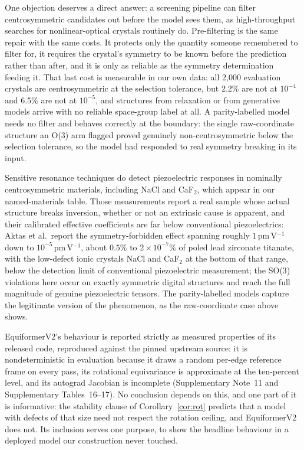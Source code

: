 One objection deserves a direct answer: a screening pipeline can filter centrosymmetric candidates out before the model sees them, as high-throughput searches for nonlinear-optical crystals routinely do. Pre-filtering is the same repair with the same costs. It protects only the quantity someone remembered to filter for, it requires the crystal's symmetry to be known before the prediction rather than after, and it is only as reliable as the symmetry determination feeding it. That last cost is measurable in our own data: all 2,000 evaluation crystals are centrosymmetric at the selection tolerance, but 2.2\% are not at $10^{-4}$ and 6.5\% are not at $10^{-5}$, and structures from relaxation or from generative models arrive with no reliable space-group label at all. A parity-labelled model needs no filter and behaves correctly at the boundary: the single raw-coordinate structure an O(3) arm flagged proved genuinely non-centrosymmetric below the selection tolerance, so the model had responded to real symmetry breaking in its input.

Sensitive resonance techniques do detect piezoelectric responses in nominally centrosymmetric materials\cite{aktas2021nominally}, including NaCl and CaF$_2$, which appear in our named-materials table. Those measurements report a real sample whose actual structure breaks inversion, whether or not an extrinsic cause is apparent, and their calibrated effective coefficients are far below conventional piezoelectrics: Aktas et al.\ report the symmetry-forbidden effect spanning roughly $1$\,pm\,V$^{-1}$ down to $10^{-5}$\,pm\,V$^{-1}$, about $0.5\%$ to $2\times10^{-7}\%$ of poled lead zirconate titanate, with the low-defect ionic crystals NaCl and CaF$_2$ at the bottom of that range, below the detection limit of conventional piezoelectric measurement; the SO(3) violations here occur on exactly symmetric digital structures and reach the full magnitude of genuine piezoelectric tensors. The parity-labelled models capture the legitimate version of the phenomenon, as the raw-coordinate case above shows.

EquiformerV2's behaviour is reported strictly as measured properties of its released code, reproduced against the pinned upstream source: it is nondeterministic in evaluation because it draws a random per-edge reference frame on every pass, its rotational equivariance is approximate at the ten-percent level, and its autograd Jacobian is incomplete (Supplementary Note~11 and Supplementary Tables~16--17). No conclusion depends on this, and one part of it is informative: the stability clause of Corollary~\ref{cor:rot} predicts that a model with defects of that size need not respect the rotation ceiling, and EquiformerV2 does not. Its inclusion serves one purpose, to show the headline behaviour in a deployed model our construction never touched.

